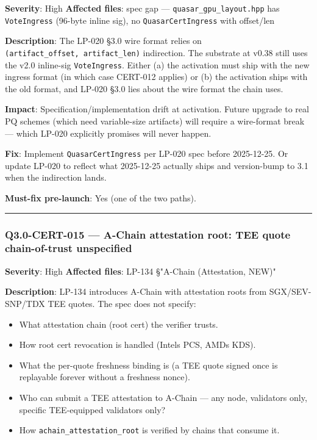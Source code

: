\documentclass[
]{article}
\providecommand{\tightlist}{%
  \setlength{\itemsep}{0pt}\setlength{\parskip}{0pt}}
\begin{document}
\textbf{Severity}: High \textbf{Affected files}: spec gap ---
\texttt{quasar\_gpu\_layout.hpp} has \texttt{VoteIngress} (96-byte
inline sig), no \texttt{QuasarCertIngress} with offset/len

\textbf{Description}: The LP-020 §3.0 wire format relies on
\texttt{(artifact\_offset,\ artifact\_len)} indirection. The substrate
at v0.38 still uses the v2.0 inline-sig \texttt{VoteIngress}. Either (a)
the activation must ship with the new ingress format (in which case
CERT-012 applies) or (b) the activation ships with the old format, and
LP-020 §3.0 lies about the wire format the chain uses.

\textbf{Impact}: Specification/implementation drift at activation.
Future upgrade to real PQ schemes (which need variable-size artifacts)
will require a wire-format break --- which LP-020 explicitly promises
will never happen.

\textbf{Fix}: Implement \texttt{QuasarCertIngress} per LP-020 spec
before 2025-12-25. Or update LP-020 to reflect what 2025-12-25 actually
ships and version-bump to 3.1 when the indirection lands.

\textbf{Must-fix pre-launch}: Yes (one of the two paths).

\begin{center}\rule{0.5\linewidth}{0.5pt}\end{center}

\subsubsection{Q3.0-CERT-015 --- A-Chain attestation root: TEE quote
chain-of-trust
unspecified}\label{q30-cert-015--a-chain-attestation-root-tee-quote-chain-of-trust-unspecified}

\textbf{Severity}: High \textbf{Affected files}: LP-134 §"A-Chain
(Attestation, NEW)"

\textbf{Description}: LP-134 introduces A-Chain with attestation roots
from SGX/SEV-SNP/TDX TEE quotes. The spec does not specify:

\begin{itemize}
\tightlist
\item
  What attestation chain (root cert) the verifier trusts.
\item
  How root cert revocation is handled (Intel\textquotesingle s PCS,
  AMD\textquotesingle s KDS).
\item
  What the per-quote freshness binding is (a TEE quote signed once is
  replayable forever without a freshness nonce).
\item
  Who can submit a TEE attestation to A-Chain --- any node, validators
  only, specific TEE-equipped validators only?
\item
  How \texttt{achain\_attestation\_root} is verified by chains that
  consume it.
\end{itemize}
\end{document}

